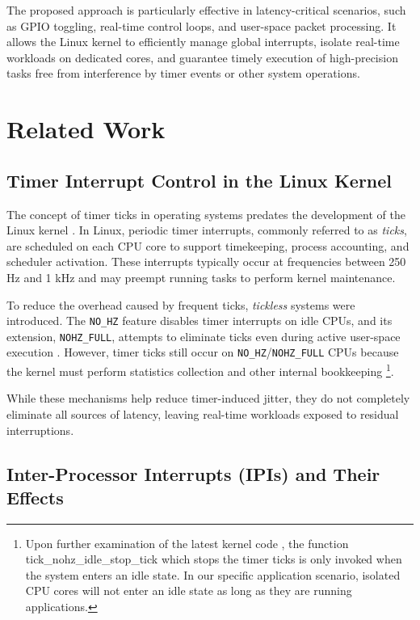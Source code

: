 \documentclass[letterpaper]{article}
\begin{document}
The proposed approach is particularly effective in latency-critical scenarios, 
such as GPIO toggling, real-time control loops, and user-space packet processing. 
It allows the Linux kernel to efficiently manage global interrupts, 
isolate real-time workloads on dedicated cores, and guarantee timely execution 
of high-precision tasks free from interference by timer events or other system operations.

\section{Related Work}\label{BG}
\subsection{Timer Interrupt Control in the Linux Kernel}

The concept of timer ticks in operating systems predates the development of the Linux kernel \cite{Corbet}. 
In Linux, periodic timer interrupts, commonly referred to as \emph{ticks}, are scheduled on each CPU core 
to support timekeeping, process accounting, and scheduler activation. These interrupts typically occur at 
frequencies between 250 Hz and 1 kHz and may preempt running tasks to perform kernel maintenance.  

To reduce the overhead caused by frequent ticks, \emph{tickless} systems were introduced. 
The \texttt{NO\_HZ} feature disables timer interrupts on idle CPUs, and its extension, 
\texttt{NOHZ\_FULL}, attempts to eliminate ticks even during active user-space execution \cite{KernelDocNOHZ}. 
However, timer ticks still occur on \texttt{NO\_HZ}/\texttt{NOHZ\_FULL} CPUs because the kernel must perform 
statistics collection and other internal bookkeeping \cite{stackoverflow} \footnote{ Upon further examination of
the latest kernel code \cite{torvalds2025linux}, the function tick\_nohz\_idle\_stop\_tick which stops
the timer ticks is only invoked when the system enters an idle state. In our specific application
scenario, isolated CPU cores will not enter an idle state as long as they are running applications.}.

While these mechanisms help reduce timer-induced jitter, they do not completely eliminate all sources of latency, 
leaving real-time workloads exposed to residual interruptions.


\subsection{Inter-Processor Interrupts (IPIs) and Their Effects}
\end{document}
